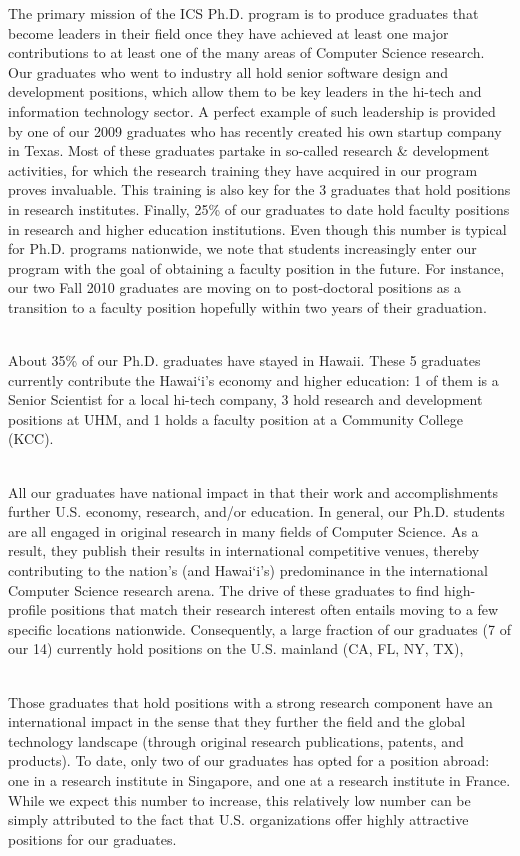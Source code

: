 \documentclass[12pt]{article}
\begin{document}
The primary mission of the ICS Ph.D. program is to produce graduates
that become leaders in their field once they have achieved at least
one major contributions to at least one of the many areas of Computer
Science research. Our graduates who went to industry all hold senior
software design and development positions, which allow them to be key
leaders in the hi-tech and information technology sector. A
perfect example of such leadership is provided by one of our 2009 graduates
who has recently created his own startup company in Texas. Most of
these graduates partake in so-called research \& development
activities, for which the research training they have acquired in our
program proves invaluable.  This training is also key for the 3
graduates that hold positions in research institutes.  Finally, 25\%
of our graduates to date hold faculty positions in research and higher
education institutions. Even though this number is typical for Ph.D.
programs nationwide, we note that students increasingly
enter our program with the goal of obtaining a faculty position in the
future. For instance, our two Fall 2010 graduates are moving on to post-doctoral positions as a
transition to a faculty position hopefully within two years of their graduation.

~\\
 About 35\% of our Ph.D. graduates have
stayed in Hawaii.  These 5 graduates currently contribute the Hawai`i's
economy and higher education: 1 of them is a Senior Scientist for a
local hi-tech company, 3 hold research and development positions
at UHM, and 1 holds a faculty position at a Community College (KCC). 

~\\
 All our graduates have
national impact in that their work and accomplishments further U.S.
economy, research, and/or education.  In general, our Ph.D. students
are all engaged in original research in many fields of Computer
Science. As a result, they publish their results in international
competitive venues, thereby contributing to the nation's (and
Hawai`i's) predominance in the international Computer Science research
arena.  The drive of these graduates to find high-profile positions
that match their research interest often entails moving to a few
specific locations nationwide.  Consequently, a large fraction of our
graduates (7 of our 14) currently hold positions on the U.S. mainland
(CA, FL, NY, TX),

~\\
 Those graduates that
hold positions with a strong research component have an international
impact in the sense that they further the field and the global technology
landscape (through original research publications, patents, and
products). To date, only two of our graduates has opted for a position
abroad: one in a research institute in Singapore, and one at a research
institute in France. While we expect this number to increase, this
relatively low number can be simply attributed to the fact that
U.S. organizations offer highly attractive positions for our graduates.
\end{document}
